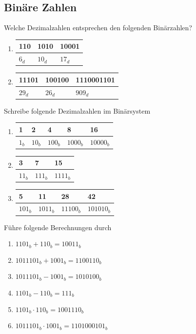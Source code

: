 \documentclass[11pt, a4paper]{article}
\begin{document}
\subsection{Binäre Zahlen}
Welche Dezimalzahlen entsprechen den folgenden Binärzahlen?
\begin{enumerate}
	\item
		\begin{tabular}{l|l|l}
			110 & 1010 & 10001 \\ \hline
			$6_d$ & $10_d$ & $17_d$
		\end{tabular}
	\item
		\begin{tabular}{l|l|l}
			11101 & 100100 & 1110001101 \\ \hline
			$29_d$ & $26_d$ & $909_d$
		\end{tabular}
\end{enumerate}
Schreibe folgende Dezimalzahlen im Binärsystem
\begin{enumerate}
	\item
		\begin{tabular}{l|l|l|l|l}
			1 & 2 & 4 & 8 & 16 \\ \hline
			$1_b$ & $10_b$ & $100_b$ & $1000_b$ & $10000_b$
		\end{tabular}
	\item
		\begin{tabular}{l|l|l}
			3 & 7 & 15 \\ \hline
			$11_b$ & $111_b$ & $1111_b$
		\end{tabular}
	\item
		\begin{tabular}{l|l|l|l}
			5 & 11 & 28 & 42\\ \hline
			$101_b$ & $1011_b$ & $11100_b$ & $101010_b$
		\end{tabular}
\end{enumerate}
Führe folgende Berechnungen durch
\begin{enumerate}
	\item $1101_b + 110_b = 10011_b$
	\item $1011101_b + 1001_b = 1100110_b$
	\item $1011101_b - 1001_b = 1010100_b$
	\item $1101_b - 110_b = 111_b$
	\item $1101_b \cdot 110_b = 1001110_b$
	\item $1011101_b \cdot 1001_b = 1101000101_b$
\end{enumerate}
\end{document}
